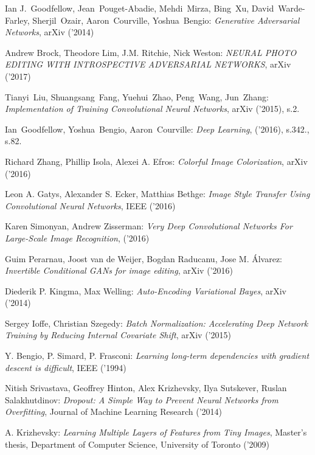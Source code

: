 \begin{thebibliography}{99} %

   Ian J.~Goodfellow, Jean~Pouget-Abadie, Mehdi~Mirza, Bing~Xu, David~Warde-Farley, Sherjil~Ozair, Aaron~Courville, Yoshua~Bengio:
  \emph{Generative Adversarial Networks}, arXiv ('2014)

   Andrew Brock, Theodore Lim, J.M. Ritchie,
  Nick Weston:
  \emph{NEURAL PHOTO EDITING WITH INTROSPECTIVE ADVERSARIAL NETWORKS}, arXiv ('2017)

   Tianyi~Liu, Shuangsang~Fang, Yuehui~Zhao, Peng~Wang, Jun~Zhang:
  \emph{Implementation of Training Convolutional Neural Networks}, arXiv ('2015), s.2.

   Ian~Goodfellow, Yoshua~Bengio, Aaron~Courville:
  \emph{Deep Learning}, ('2016), s.342., s.82.

   Richard Zhang, Phillip Isola, Alexei A. Efros:
  \emph{Colorful Image Colorization}, arXiv ('2016)

   Leon A. Gatys, Alexander S. Ecker, Matthias Bethge:
  \emph{Image Style Transfer Using Convolutional Neural Networks}, IEEE ('2016)

   Karen Simonyan, Andrew Zisserman:
  \emph{Very Deep Convolutional Networks For Large-Scale Image Recognition}, ('2016)

   Guim Perarnau, Joost van de Weijer, Bogdan Raducanu, Jose M. Álvarez:
  \emph{Invertible Conditional GANs for image editing}, arXiv ('2016)

   Diederik P. Kingma, Max Welling:
  \emph{Auto-Encoding Variational Bayes}, arXiv ('2014)

   Sergey Ioffe, Christian Szegedy:
  \emph{Batch Normalization: Accelerating Deep Network Training by Reducing
  Internal Covariate Shift}, arXiv ('2015)


   Y. Bengio, P. Simard, P. Frasconi:
  \emph{Learning long-term dependencies with gradient descent is difficult},
  IEEE ('1994)

   Nitish Srivastava, Geoffrey Hinton, Alex Krizhevsky,
  Ilya Sutskever, Ruslan Salakhutdinov:
  \emph{Dropout: A Simple Way to Prevent Neural Networks from Overfitting},
  Journal of Machine Learning Research ('2014)

   A. Krizhevsky:
  \emph{Learning Multiple Layers of Features from Tiny Images},
  Master’s thesis, Department of Computer Science, University of Toronto ('2009)


\end{thebibliography}
